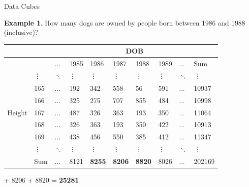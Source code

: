 \documentclass{beamer}
\theoremstyle{definition}
\newtheorem{myexample}{Example}
\theoremstyle{definition}
\begin{document}
\begin{frame}{Data Cubes}
    \begin{myexample}
        How many dogs are owned by people born between 1986 and 1988 (inclusive)?
    \end{myexample}

    \begin{table}[h]\footnotesize
        \begin{tabular} { | l | l | l | l | l | l | l | l | l | l |}
        \hline
        & & \multicolumn{8}{|c|}{DOB} \\ \hline
        & & $\hdots$ & 1985 & 1986 & 1987 & 1988 & 1989 & $\hdots$ & Sum \\ \hline
        \multirow{7}{*}{Height}
        & \vdots & $\ddots$ & \vdots & \vdots & \vdots & \vdots & \vdots & $\ddots$ & \vdots \\
        & 165 & $\hdots$ & 192 & 342 & 558 & 56 & 591 & $\hdots$ & 10937 \\
        & 166 & $\hdots$ & 325 & 275 & 707 & 855 & 484 & $\hdots$ & 10998 \\
        & 167 & $\hdots$ & 487 & 326 & 363 & 193 & 350 & $\hdots$ & 11064 \\
        & 168 & $\hdots$ & 326 & 363 & 193 & 350 & 422 & $\hdots$ & 10913 \\
        & 169 & $\hdots$ & 438 & 456 & 550 & 385 & 412 & $\hdots$ & 11347 \\
        & \vdots & $\ddots$ & \vdots & \vdots & \vdots & \vdots & \vdots & $\ddots$ & \vdots \\
        & Sum & $\hdots$ & 8121 & \textbf{8255} & \textbf{8206} & \textbf{8820} & 8026 & $\hdots$ & 202169 \\
        \hline
        \end{tabular}
    \end{table}
     + 8206 + 8820 = \textbf{25281}
\end{frame}
\end{document}
